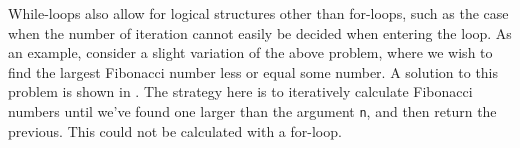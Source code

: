 \documentclass[fsharpNotes.tex]{subfiles}
\begin{document}

While-loops also allow for logical structures other than for-loops, such as the case when the number of iteration cannot easily be decided when entering the loop. As an example, consider a slight variation of the above problem, where we wish to find the largest Fibonacci number less or equal some number. A solution to this problem is shown in .
%
%
The strategy here is to iteratively calculate Fibonacci numbers until we've found one larger than the argument \lstinline{n}, and then return the previous. This could not be calculated with a for-loop.
\end{document}
